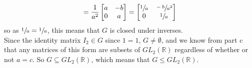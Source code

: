 \documentclass[12pt]{article}
\newcommand{\R}{\mathbb{R}}
\begin{document}
\begin{enumerate}[label=\textbf{\alph*.}]
\[            = \dfrac{1}{a^2}\begin{bmatrix}
            a & -b \\
            0 & a \\
            \end{bmatrix}
            = \begin{bmatrix}
            \sfrac{1}{a} & \sfrac{-b}{a^2} \\
            0 & \sfrac{1}{a} \\
            \end{bmatrix} \]
            so as $\sfrac{1}{a} = \sfrac{1}{a}$,
            this means that $G$ is closed under inverses. \\
            Since the identity matrix $I_2 \in G$ since $1 = 1$,
            $G \neq \emptyset$,
            and we know from part c that any matrices of this form are
            subsets of $GL_2(\R)$ regardless of whether or not $a = c$.
            So $G \subseteq GL_2(\R)$,
            which means that $G \leqslant GL_2(\R)$.
    \end{enumerate}  
    
    
\end{document}
